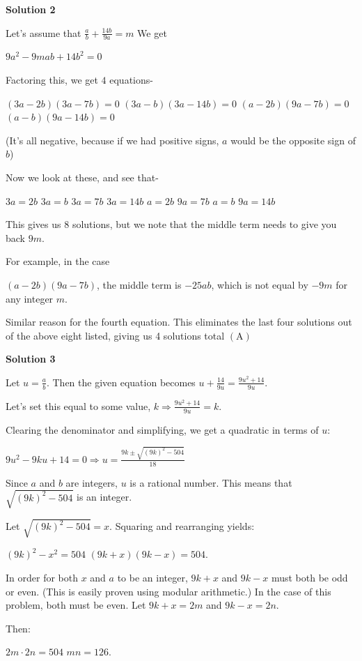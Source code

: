\begin{enumerate}
\textbf{Solution 2}

Let's assume that $\frac{a}{b} + \frac{14b}{9a} = m$ We get

 $9a^2 - 9mab + 14b^2 = 0$

 Factoring this, we get $4$ equations-

 $(3a-2b)(3a-7b) = 0$
$(3a-b)(3a-14b) = 0$
$(a-2b)(9a-7b) = 0$
$(a-b)(9a-14b) = 0$

 (It's all negative, because if we had positive signs, $a$ would be the opposite sign of $b$)

 Now we look at these, and see that-

 $3a=2b$
$3a=b$
$3a=7b$
$3a=14b$
$a=2b$
$9a=7b$
$a=b$
$9a=14b$

 This gives us $8$ solutions, but we note that the middle term needs to give you back $9m$.

 For example, in the case 

 $(a-2b)(9a-7b)$, the middle term is $-25ab$, which is not equal by $-9m$ for any integer $m$.

 Similar reason for the fourth equation. This eliminates the last four solutions out of the above eight listed, giving us 4 solutions total $\mathrm {(A)}$




\textbf{Solution 3}

Let $u = \frac{a}{b}$. Then the given equation becomes $u + \frac{14}{9u} = \frac{9u^2 + 14}{9u}$.

 Let's set this equal to some value, $k \Rightarrow \frac{9u^2 + 14}{9u} = k$.

 Clearing the denominator and simplifying, we get a quadratic in terms of $u$:

 $9u^2 - 9ku + 14 = 0 \Rightarrow u = \frac{9k \pm \sqrt{(9k)^2 - 504}}{18}$

 Since $a$ and $b$ are integers, $u$ is a rational number. This means that $\sqrt{(9k)^2 - 504}$ is an integer.

 Let $\sqrt{(9k)^2 - 504} = x$. Squaring and rearranging yields:

 $(9k)^2 - x^2 = 504$
$(9k+x)(9k-x) = 504$.

 In order for both $x$ and $a$ to be an integer, $9k + x$ and $9k - x$ must both be odd or even. (This is easily proven using modular arithmetic.) In the case of this problem, both must be even. Let $9k + x = 2m$ and $9k - x = 2n$.

 Then:

 $2m \cdot 2n = 504$
$mn = 126$.


\end{enumerate}
